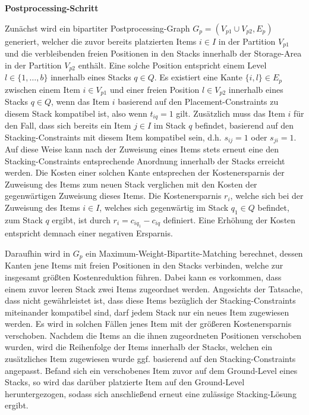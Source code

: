 \textbf{Postprocessing-Schritt}

Zunächst wird ein bipartiter Postprocessing-Graph $G_p = (V_{p1} \cup V_{p2}, E_p)$ generiert, welcher die zuvor bereits platzierten Items $i \in I$ in der Partition $V_{p1}$ und die verbleibenden freien Positionen in den Stacks innerhalb der Storage-Area in der Partition $V_{p2}$ enthält. Eine solche Position entspricht einem Level $l \in \{1, \dotsc, b\}$ innerhalb eines Stacks $q \in Q$. Es existiert eine Kante $\{i, l\} \in E_p$ zwischen einem Item $i \in V_{p1}$ und einer freien Position $l \in V_{p2}$ innerhalb eines Stacks $q \in Q$, wenn das Item $i$ basierend auf den Placement-Constraints zu diesem Stack kompatibel ist, also wenn $t_{iq} = 1$ gilt. Zusätzlich muss das Item $i$ für den Fall, dass sich bereits ein Item $j \in I$ im Stack $q$ befindet, basierend auf den Stacking-Constraints mit diesem Item kompatibel sein, d.h. $s_{ij} = 1$ oder $s_{ji} = 1$.
Auf diese Weise kann nach der Zuweisung eines Items stets erneut eine den Stacking-Constraints entsprechende Anordnung innerhalb der Stacks erreicht werden. Die Kosten einer solchen Kante entsprechen der Kostenersparnis der Zuweisung des Items zum neuen Stack verglichen mit den Kosten der gegenwärtigen Zuweisung dieses Items. Die Kostenersparnis $r_i$, welche sich bei der Zuweisung des Items $i \in I$, welches sich gegenwärtig im Stack $q_1 \in Q$ befindet, zum Stack $q$ ergibt, ist durch $r_i = c_{iq_1} - c_{iq}$ definiert. Eine Erhöhung der Kosten entspricht demnach einer negativen Ersparnis.

Daraufhin wird in $G_p$ ein Maximum-Weight-Bipartite-Matching berechnet, dessen Kanten jene Items mit freien
Positionen in den Stacks verbinden, welche zur insgesamt größten Kostenreduktion führen.
Dabei kann es vorkommen, dass einem zuvor leeren Stack zwei Items zugeordnet werden. Angesichts der Tatsache,
dass nicht gewährleistet ist, dass diese Items bezüglich der Stacking-Constraints miteinander kompatibel sind,
darf jedem Stack nur ein neues Item zugewiesen werden.
Es wird in solchen Fällen jenes Item mit der größeren Kostenersparnis verschoben.
Nachdem die Items an die ihnen zugeordneten Positionen verschoben wurden,
wird die Reihenfolge der Items innerhalb der Stacks, welchen ein zusätzliches Item zugewiesen
wurde ggf. basierend auf den Stacking-Constraints angepasst.
Befand sich ein verschobenes Item zuvor auf dem Ground-Level eines Stacks,
so wird das darüber platzierte Item auf den Ground-Level heruntergezogen,
sodass sich anschließend erneut eine zulässige Stacking-Lösung ergibt.

